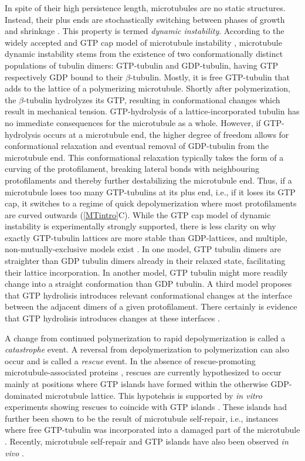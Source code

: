 In spite of their high persistence length, microtubules are no static structures. Instead, their plus ends are stochastically switching between phases of growth and shrinkage \parencite{Janosi2002}. This property is termed \textit{dynamic instability}. According to the widely accepted and GTP cap model of microtubule instability , microtubule dynamic instability stems from the existence of two conformationally distinct populations of tubulin dimers: GTP-tubulin and GDP-tubulin, having GTP respectively GDP bound to their $\beta$-tubulin. Mostly, it is free GTP-tubulin that adds to the lattice of a polymerizing microtubule. Shortly after polymerization, the $\beta$-tubulin hydrolyzes its GTP, resulting in conformational changes which result in mechanical tension. GTP-hydrolysis of a lattice-incorporated tubulin has no immediate consequences for the microtubule as a whole. However, if GTP-hydrolysis occurs at a microtubule end, the higher degree of freedom allows for conformational relaxation and eventual removal of GDP-tubulin from the microtubule end. This conformational relaxation typically takes the form of a curving of the protofilament, breaking lateral bonds with neighbouring protofilaments and thereby further destabilizing the microtubule end. Thus, if a microtubule loses too many GTP-tubulins at its plus end, i.e., if it loses its GTP cap, it switches to a regime of quick depolymerization where most protofilaments are curved outwards (\autoref{MTintro}C). While the GTP cap model of dynamic instability is experimentally strongly supported, there is less clarity on why exactly GTP-tubulin lattices are more stable than GDP-lattices, and multiple, non-mutually-exclusive models exist . In one model, GTP tubulin dimers are straighter than GDP tubulin dimers already in their relaxed state, facilitating their lattice incorporation. In another model, GTP tubulin might more readily change into a straight conformation than GDP tubulin. A third model proposes that GTP hydrolisis introduces relevant conformational changes at the interface between the adjacent dimers of a given protofilament. There certainly is evidence that GTP hydrolisis introduces changes at these interfaces .\par

A change from continued polymerization to rapid depolymerization is called a \textit{catastrophe} event. A reversal from depolymerization to polymerization can also occur and is called a \textit{rescue} event. In the absence of rescue-promoting microtubule-associated proteins , rescues are currently hypothesized to occur mainly at positions where GTP islands have formed within the otherwise GDP-dominated microtubule lattice. This hypotehsis is supported by \textit{in vitro} experiments showing rescues to coincide with GTP islands . These islands had further been shown to be the result of microtubule self-repair, i.e., instances where free GTP-tubulin was incorporated into a damaged part of the microtubule . Recently, microtubule self-repair and GTP islands have also been observed \textit{in vivo} .\par


